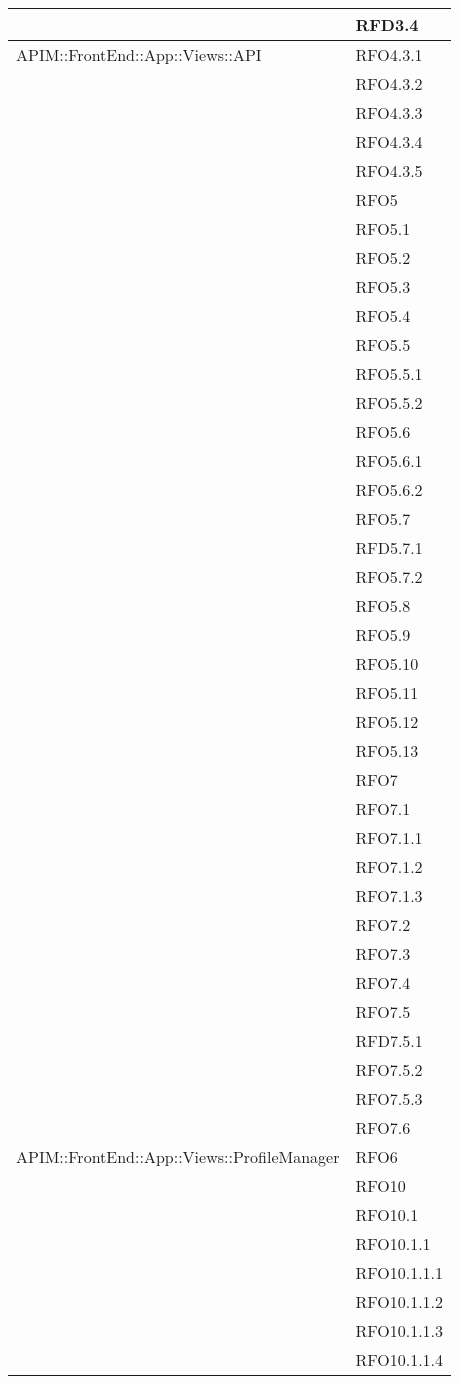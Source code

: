 \begin{longtable}{ p{12cm} | p{4cm} }
	& RFD3.4 \\
	\hline
	APIM::FrontEnd::App::Views::API
	& RFO4.3.1 \\
	& RFO4.3.2 \\
	& RFO4.3.3 \\
	& RFO4.3.4 \\
	& RFO4.3.5 \\
	& RFO5 \\
	& RFO5.1 \\
	& RFO5.2 \\
	& RFO5.3 \\
	& RFO5.4 \\
	& RFO5.5 \\
	& RFO5.5.1 \\
	& RFO5.5.2 \\
	& RFO5.6 \\
	& RFO5.6.1 \\
	& RFO5.6.2 \\
	& RFO5.7 \\
	& RFD5.7.1 \\
	& RFO5.7.2 \\
	& RFO5.8 \\
	& RFO5.9 \\
	& RFO5.10 \\
	& RFO5.11 \\
	& RFO5.12 \\
	& RFO5.13 \\
	& RFO7 \\
	& RFO7.1 \\
	& RFO7.1.1 \\
	& RFO7.1.2 \\
	& RFO7.1.3 \\
	& RFO7.2 \\
	& RFO7.3 \\
	& RFO7.4 \\
	& RFO7.5 \\
	& RFD7.5.1 \\
	& RFO7.5.2 \\
	& RFO7.5.3 \\
	& RFO7.6 \\
	\hline
	APIM::FrontEnd::App::Views::ProfileManager
	& RFO6 \\
	& RFO10 \\
	& RFO10.1 \\
	& RFO10.1.1 \\
	& RFO10.1.1.1 \\
	& RFO10.1.1.2 \\
	& RFO10.1.1.3 \\
	& RFO10.1.1.4 \\

\end{longtable}

